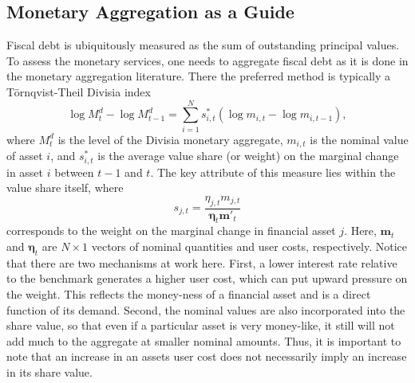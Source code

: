 \documentclass[11pt,a4paper,margin=1.5in]{article}
\begin{document}
\subsection{Monetary Aggregation as a Guide}
Fiscal debt is ubiquitously measured as the sum of outstanding principal values.
To assess the monetary services, one needs to aggregate fiscal debt as it is done in the monetary aggregation literature. 
There the preferred method is typically a T\"{o}rnqvist-Theil Divisia index
	\begin{equation*}
		\log{M^d_t} - \log{M^d_{t-1}} = \sum_{i=1}^{N}s^*_{i,t}\left(\log{m_{i,t}} - \log{m_{i,t-1}}\right),
		\label{DI}
	\end{equation*}
where $M^d_t$ is the level of the Divisia monetary aggregate, $m_{i,t}$ is the nominal value of asset $i$, and $s^*_{i,t}$ is the average value share (or weight) on the marginal change in asset $i$ between $t-1$ and $t$.
The key attribute of this measure lies within the value share itself, where
	\begin{equation*}
		s_{j,t}  = \frac{\eta_{j,t}m_{j,t}}{\boldsymbol \eta_t \mathbf{m'}_t} %
	\end{equation*}
corresponds to the weight on the marginal change in financial asset $j$.
Here, $\mathbf{m}_t$ and $\boldsymbol \eta_t$ are $N \times 1$ vectors of nominal quantities and user costs, respectively.
Notice that there are two mechanisms at work here.
First, a lower interest rate relative to the benchmark generates a higher user cost, which can put upward pressure on the weight.
This reflects the money-ness of a financial asset and is a direct function of its demand.
Second, the nominal values are also incorporated into the share value, so that even if a particular asset is very money-like, it still will not add much to the aggregate at smaller nominal amounts. 
Thus, it is important to note that an increase in an assets user cost does not necessarily imply an increase in its share value.
\end{document}

